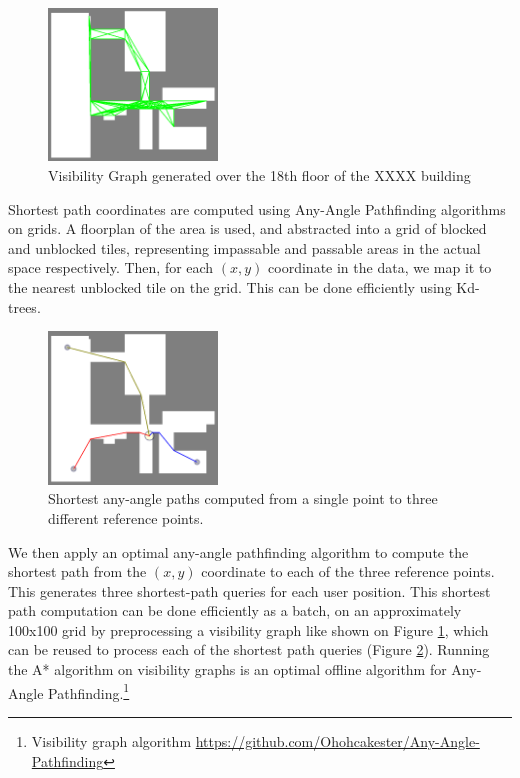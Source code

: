 \documentclass[letterpaper]{article}
\begin{document}
\begin{figure}[!h]
  \centering
    \includegraphics[width=170px]{diagrams/floor18visibilitygraph.png}
  \caption{Visibility Graph generated over the 18th floor of the XXXX building}
  \label{fig:floor18vg}
\end{figure}

Shortest path coordinates are computed using Any-Angle Pathfinding algorithms on grids. A floorplan of the area is used, and abstracted into a grid of blocked and unblocked tiles, representing impassable and passable areas in the actual space respectively. Then, for each $(x,y)$ coordinate in the data, we map it to the nearest unblocked tile on the grid. This can be done efficiently using Kd-trees.\\

\begin{figure}[!h]
  \centering
    \includegraphics[width=170px]{diagrams/floor18shortestpaths.png}
  \caption{Shortest any-angle paths computed from a single point to three different reference points.}
  \label{fig:floor18sps}
\end{figure}

We then apply an optimal any-angle pathfinding algorithm to compute the shortest path from the $(x,y)$ coordinate to each of the three reference points. This generates three shortest-path queries for each user position. This shortest path computation can be done efficiently as a batch, on an approximately 100x100 grid by preprocessing a visibility graph like shown on Figure \ref{fig:floor18vg}, which can be reused to process each of the shortest path queries (Figure \ref{fig:floor18sps}). Running the A* algorithm on visibility graphs is an optimal offline algorithm for Any-Angle Pathfinding.\footnote{Visibility graph algorithm \url{https://github.com/Ohohcakester/Any-Angle-Pathfinding}}\\
\end{document}
